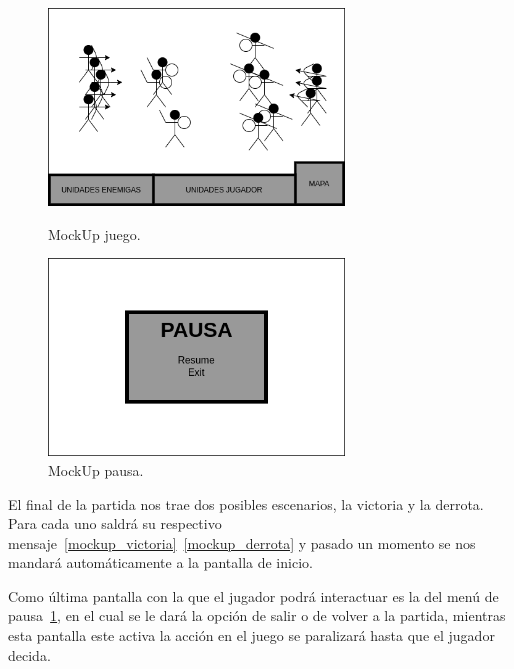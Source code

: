 \begin{figure}[ht]
\centering
\begin{minipage}[c]{0.45\linewidth}
	\hspace{9mm}
	\includegraphics[width=0.7\textwidth]{imagenes/gdd/pantallas/Pantalla_gameplay.png}
	\caption{MockUp juego.}
	\label{mockup_juego}
\end{minipage}
\begin{minipage}[c]{0.45\linewidth}
	\hspace{9mm}
	\includegraphics[width=0.7\textwidth]{imagenes/gdd/pantallas/Pantalla_pausa.png}
	\caption{MockUp pausa.}
	\label{mockup_pausa}
\end{minipage}	
\end{figure}

El final de la partida nos trae dos posibles escenarios, la victoria y la derrota. 
Para cada uno saldrá su respectivo mensaje~\ref{mockup_victoria}~\ref{mockup_derrota}
y pasado un momento se nos mandará automáticamente a la pantalla de
inicio.

Como última pantalla con la que el jugador podrá interactuar es la del menú de
pausa~\ref{mockup_pausa}, en el cual se le dará la opción de salir o de volver a la
partida, mientras esta pantalla este activa la acción en el juego se paralizará hasta
que el jugador decida. 


